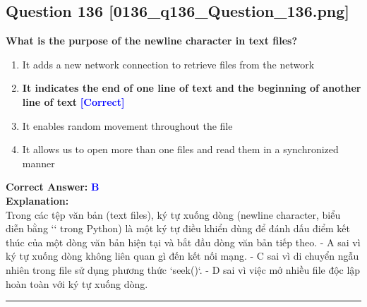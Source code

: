\documentclass[11pt,a4paper]{article}
\begin{document}
\begin{minipage}{\textwidth}
\subsection*{Question 136 \quad \footnotesize{[0136_q136_Question_136.png]}}
\noindent \textbf{What is the purpose of the newline character in text files?}

\begin{enumerate}[label=\Alph*.]
    \item It adds a new network connection to retrieve files from the network
    \item \textbf{It indicates the end of one line of text and the beginning of another line of text} \hfill \textcolor{blue}{\textbf{[Correct]}}
    \item It enables random movement throughout the file
    \item It allows us to open more than one files and read them in a synchronized manner
\end{enumerate}

\noindent \textbf{Correct Answer:} \textcolor{blue}{\textbf{B}} \\[4pt]
\noindent \textbf{Explanation:}\\
Trong các tệp văn bản (text files), ký tự xuống dòng (newline character, biểu diễn bằng `\n` trong Python) là một ký tự điều khiển dùng để đánh dấu điểm kết thúc của một dòng văn bản hiện tại và bắt đầu dòng văn bản tiếp theo.\newline
- A sai vì ký tự xuống dòng không liên quan gì đến kết nối mạng.\newline
- C sai vì di chuyển ngẫu nhiên trong file sử dụng phương thức `seek()`.\newline
- D sai vì việc mở nhiều file độc lập hoàn toàn với ký tự xuống dòng.
\end{minipage}
\vspace{0.8cm}
\hrule
\vspace{0.5cm}
\end{document}
